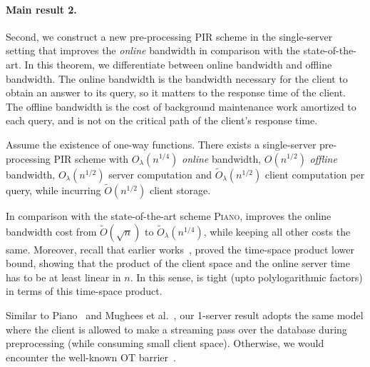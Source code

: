 

\paragraph{Main result 2.}
Second, we construct a new pre-processing PIR scheme in the single-server
setting that improves the {\it online} bandwidth in comparison with the
state-of-the-art.  
In this theorem, we differentiate between online bandwidth and offline bandwidth.
The online bandwidth is the bandwidth necessary for the client
to obtain an answer to its query, so it matters to the response time of the client. 
The offline bandwidth is the cost of background maintenance work
amortized to each query, and is not on the critical path of the client's response time. 

\begin{theorem}
Assume the existence of one-way functions. 
There exists a single-server pre-processing PIR scheme 
with ${O}_\lambda(n^{1/4})$
{\it online} bandwidth, 
${O}(n^{1/2})$
{\it offline} bandwidth, 
${O}_\lambda(n^{1/2})$ server computation and  
$\widetilde{O}_\lambda(n^{1/2})$ client computation per query, 
while incurring
$\widetilde{O}(n^{1/2})$ 
client storage. 
\label{thm:intro-1server}
\end{theorem}

In comparison with the state-of-the-art scheme \textsc{Piano},
improves the online bandwidth cost
from $\widetilde{O}(\sqrt{n})$ to 
$\widetilde{O}_\lambda(n^{1/4})$, while keeping all other costs
the same. 
Moreover, recall that 
earlier works~\cite{sublinearpir,pir-ec22}, 
proved 
the time-space product lower bound, showing
that the product of the  
client space and the online server time
has to be at least linear in $n$. 
In this sense, 
is tight 
(upto polylogarithmic factors) in terms of this time-space product.

Similar to Piano~\cite{piano} and   
Mughees et al.~\cite{lingrenpir}, 
our 1-server result 
adopts the same model where the client is allowed
to make a streaming pass over 
the database during preprocessing (while consuming
small client space). Otherwise, we would encounter the well-known OT barrier~\cite{pirot}.

